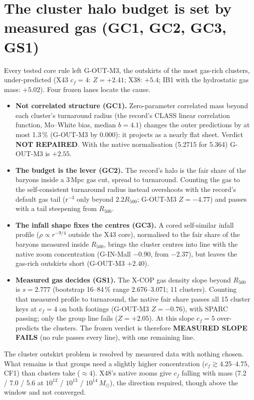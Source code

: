 \documentclass[10pt]{article}
\begin{document}
\section{The cluster halo budget is set by measured gas (GC1, GC2, GC3, GS1)}
Every tested core rule left G-OUT-M3, the outskirts of the most gas-rich clusters, under-predicted (X43 $c_f=4$: $Z=+2.41$; X38: $+5.4$; IB1 with the hydrostatic gas mass: $+5.02$). Four frozen lanes locate the cause.
\begin{itemize}
\item \textbf{Not correlated structure (GC1).} Zero-parameter correlated mass beyond each cluster's turnaround radius (the record's CLASS linear correlation function, Mo--White bias, median $b=4.1$) changes the outer predictions by at most 1.3\,\% (G-OUT-M3 by 0.000): it projects as a nearly flat sheet. Verdict \textbf{NOT REPAIRED}. With the native normalisation (5.2715 for 5.364) G-OUT-M3 is $+2.55$.
\item \textbf{The budget is the lever (GC2).} The record's halo is the fair share of the baryons inside a 3\,Mpc gas cut, spread to turnaround. Counting the gas to the self-consistent turnaround radius instead overshoots with the record's default gas tail (r$^{-3}$ only beyond $2.2R_{500}$; G-OUT-M3 $Z=-4.77$) and passes with a tail steepening from $R_{500}$.
\item \textbf{The infall shape fixes the centres (GC3).} A cored self-similar infall profile ($\rho\propto r^{-9/4}$ outside the X43 core), normalised to the fair share of the baryons measured inside $R_{500}$, brings the cluster centres into line with the native zoom concentration (G-IN-Mall $-0.90$, from $-2.37$), but leaves the gas-rich outskirts short (G-OUT-M3 $+2.40$).
\item \textbf{Measured gas decides (GS1).} The X-COP gas density slope beyond $R_{500}$ is $s=2.777$ (bootstrap 16--84\,\% range 2.676--3.071; 11 clusters). Counting that measured profile to turnaround, the native fair share passes all 15 cluster keys at $c_f=4$ on both footings (G-OUT-M3 $Z=-0.76$), with SPARC passing; only the group line fails ($Z=+2.05$). At this slope $c_f=5$ over-predicts the clusters. The frozen verdict is therefore \textbf{MEASURED SLOPE FAILS} (no rule passes every line), with one remaining line.
\end{itemize}
The cluster outskirt problem is resolved by measured data with nothing chosen. What remains is that groups need a slightly higher concentration ($c_f\gtrsim4.25$--$4.75$, CF1) than clusters take ($\approx4$). X48's native zooms give $c_f$ falling with mass (7.2 / 7.0 / 5.6 at $10^{12}$ / $10^{13}$ / $10^{14}\,M_\odot$), the direction required, though above the window and not converged.
\end{document}
